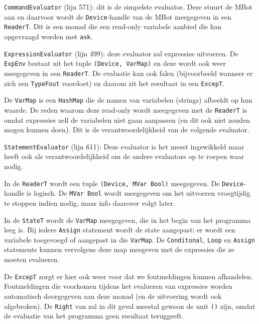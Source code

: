 \documentclass[11pt]{article}
\begin{document}
\begin{description}
    \item{\tt CommandEvaluator} (lijn 571): dit is de simpelste evaluator. Deze stuurt de MBot aan en daarvoor wordt de \texttt{Device}-handle van de MBot meegegeven in een \texttt{ReaderT}. Dit is een monad die een read-only variabele aanbied die kan opgevraagd worden met \texttt{ask}.
    \item{\tt ExpressionEvaluator} (lijn 499): deze evaluator zal expressies uitvoeren. De \texttt{ExpEnv} bestaat uit het tuple \texttt{(Device, VarMap)} en deze wordt ook weer meegegeven in een \texttt{ReaderT}. De evaluatie kan ook falen (bijvoorbeeld wanneer er zich een \texttt{TypeFout} voordoet) en daarom zit het resultaat in een \texttt{ExcepT}.

        De \texttt{VarMap} is een \texttt{HashMap} die de namen van variabelen (strings) afbeeldt op hun waarde. De reden waarom deze read-only wordt meegegeven met de \texttt{ReaderT} is omdat expressies zelf de variabelen niet gaan aanpassen (en dit ook niet zouden mogen kunnen doen). Dit is de verantwoordelijkheid van de volgende evaluator.
    \item{\tt StatementEvaluator} (lijn 611):
        Deze evaluator is het meest ingewikkeld maar heeft ook als verantwoordelijkheid om de andere evaluators op te roepen waar nodig.

        In de \texttt{ReaderT} wordt een tuple \texttt{(Device, MVar Bool)} meegegeven. De \texttt{Device}-handle is logisch. De \texttt{MVar Bool} wordt meegegeven om het uitvoeren vroegtijdig te stoppen indien nodig, maar info daarover volgt later.

        In de \texttt{StateT} wordt de \texttt{VarMap} meegegeven, die in het begin van het programma leeg is. Bij iedere \texttt{Assign} statement wordt de state aangepast: er wordt een variabele toegevoegd of aangepast in die \texttt{VarMap}. De \texttt{Conditonal}, \texttt{Loop} en \texttt{Assign} statements kunnen vervolgens deze map meegeven met de expressies die ze moeten evalueren.

        De \texttt{ExcepT} zorgt er hier ook weer voor dat we foutmeldingen kunnen afhandelen. Foutmeldingen die voorkomen tijdens het evalueren van expressies worden automatisch doorgegeven aan deze monad (en de uitvoering wordt ook afgebroken). De \texttt{Right} van zal in dit geval meestal gewoon de unit \texttt{()} zijn, omdat de evaluatie van het programma geen resultaat teruggeeft.
\end{description}
\end{document}
